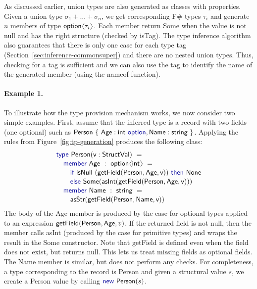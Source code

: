 \documentclass[preprint]{sigplanconf}
\newcommand{\langl}{\begin{picture}(4.5,7)
\put(1.1,2.5){\rotatebox{60}{\line(1,0){5.5}}}
\put(1.1,2.5){\rotatebox{300}{\line(1,0){5.5}}}
\end{picture}}
\newcommand{\rangl}{\begin{picture}(4.5,7)
\put(.9,2.5){\rotatebox{120}{\line(1,0){5.5}}}
\put(.9,2.5){\rotatebox{240}{\line(1,0){5.5}}}
\end{picture}}
\newcommand{\kvd}[1]{\textnormal{\textcolor{kvdclr}{\sffamily #1}}}
\newcommand{\ident}[1]{\textnormal{\sffamily #1}}
\begin{document}
As discussed earlier, union types are also generated as classes with properties. Given a union type $\sigma_1 + \ldots + \sigma_n$,
we get corresponding F\# types $\tau_i$ and generate $n$ members of type $\ident{option}\langl \tau_i\rangl$.
Each member return \ident{Some} when the value is not \kvd{null} and has the right structure (checked by 
\ident{isTag}). The type inference algorithm also guarantees that there is only one case for each type tag 
(Section~\ref{sec:inference-commonsuper}) and there are no nested union types. Thus, checking for a tag is
sufficient and we can also use the tag to identify the name of the generated member (using the
\ident{nameof} function).

\paragraph{Example 1.}
To illustrate how the type provision mechanism works, we now consider two simple examples. First, assume 
that the inferred type is a record with two fields (one optional) such as 
$\ident{Person}~\{~\ident{Age}:\ident{int}~\kvd{option}, \ident{Name}:\ident{string}~ \}$. Applying the
rules from Figure~\ref{fig:tp-generation} produces the following class:
%
\begin{equation*}
\begin{array}{l}
 \kvd{type}~\ident{Person}(\ident{v}:\ident{StructVal})~= \\[0.1em]
 \quad \kvd{member}~\ident{Age}~:~\ident{option}\langl\ident{int}\rangl~= \\[0.1em]
 \qquad \kvd{if}~\ident{isNull}~(\ident{getField}(\ident{Person},\ident{Age}, \ident{v}))~\kvd{then}~\ident{None} \\[0.1em]
 \qquad \kvd{else}~\ident{Some}(\ident{asInt}(\ident{getField}(\ident{Person},\ident{Age}, \ident{v}))) \\[0.1em]
 \quad \kvd{member}~\ident{Name}~:~\ident{string}~= \\[0.1em]
 \qquad \ident{asStr}(\ident{getField}(\ident{Person},\ident{Name}, \ident{v}))
\end{array}
\end{equation*}
%
The body of the \ident{Age} member is produced by the case for optional types applied to an expression
$\ident{getField}(\ident{Person},\ident{Age},v)$. If the returned field is not \kvd{null}, then the member
calls \ident{asInt} (produced by the case for primitive types) and wraps the result in the \ident{Some}
constructor. Note that \ident{getField} is defined even when the field does not exist, but returns \ident{null}.
This lets us treat missing fields as optional fields. The \ident{Name} member is similar, but does not 
perform any checks. 
For completeness, a type corresponding to the record is \ident{Person} and given a 
structural value $s$, we create a \ident{Person} value by calling $\kvd{new}~\ident{Person}(s)$.
\end{document}
